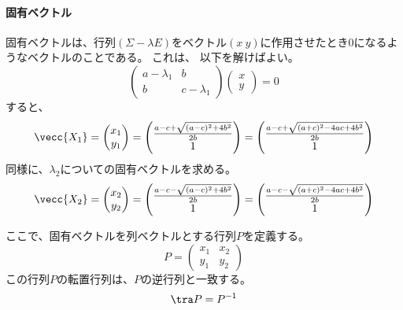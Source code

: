 \paragraph{固有ベクトル}
固有ベクトルは、行列$(\Sigma-\lambda E)$をベクトル$(x\ y)$に作用させたとき$0$になるようなベクトルのことである。
これは、
以下を解けばよい。
\begin{equation*}
 \begin{pmatrix}
  a-\lambda_1 & b  \\
 b 
& c-\lambda_1
 \end{pmatrix}
\begin{pmatrix}
 x\\
 y
\end{pmatrix}=0
\end{equation*}
すると、
\begin{equation*}
 \vecc{X_1} = \begin{pmatrix}
  x_1 \\
  y_1
 \end{pmatrix} =
\begin{pmatrix}
 \frac{a-c+\sqrt{(a-c)^2+4b^2}}{2b}\\
 1
\end{pmatrix} = 
\begin{pmatrix}
 \frac{a-c+\sqrt{(a+c)^2-4ac+4b^2}}{2b}\\
 1
\end{pmatrix}
\end{equation*}
同様に、$\lambda_2$についての固有ベクトルを求める。
\begin{equation*}
 \vecc{X_2}=\begin{pmatrix}
  x_2 \\
  y_2
 \end{pmatrix} =
\begin{pmatrix}
 \frac{ a-c-\sqrt{(a-c)^2+4b^2} }{2b}\\
 1
\end{pmatrix} = 
\begin{pmatrix}
 \frac{ a-c-\sqrt{(a+c)^2-4ac+4b^2} }{2b}\\
 1
\end{pmatrix}
\end{equation*}


ここで、固有ベクトルを列ベクトルとする行列$P$を定義する。
\begin{equation*}
 P = \begin{pmatrix}
      x_1 & x_2\\
      y_1 & y_2
     \end{pmatrix}
\end{equation*}
この行列$P$の転置行列は、$P$の逆行列と一致する。
\begin{equation*}
 \tra P = P^{-1}
\end{equation*}

